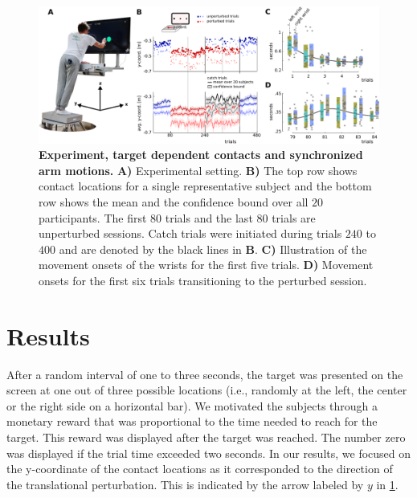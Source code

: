 \begin{figure}[t]
\centering
\includegraphics[width=\textwidth]{Elmar/picsClean/Fig1ExperimentContactsOnsets}
 \caption{\textbf{Experiment, target dependent contacts and synchronized arm motions.} \textbf{A)} Experimental setting. 
 \textbf{B)}  The top row shows contact locations for a single representative subject 
 and the bottom row shows the mean and the confidence bound over all $20$ participants. 
 The first $80$ trials and the last $80$ trials are unperturbed sessions. 
 Catch trials were initiated during trials $240$ to $400$ and are denoted by the black lines in \textbf{B}.
%  
 \textbf{C)} Illustration of the movement onsets of the wrists for the first five trials. 
 \textbf{D)} Movement onsets for the first six trials transitioning to the perturbed session. 
}
\label{fig:subFigContactLocationsAllSubjects}
\end{figure}


\section*{Results}%

After a random interval of one to 
three seconds, the target was presented on the screen at one out of three possible locations (i.e., randomly at the left, the center or the right side on a horizontal bar). We motivated the subjects 
through a monetary reward that was proportional to the time needed to reach for 
the target. This reward was displayed after the target was reached. The number zero was displayed if the trial time exceeded two seconds. 
In our results, we focused on the y-coordinate of the contact locations 
as it corresponded to the direction of the translational 
perturbation. This is indicated by the arrow labeled by $y$ in \FigureAbbrP \ref{fig:subFigContactLocationsAllSubjects}. 

